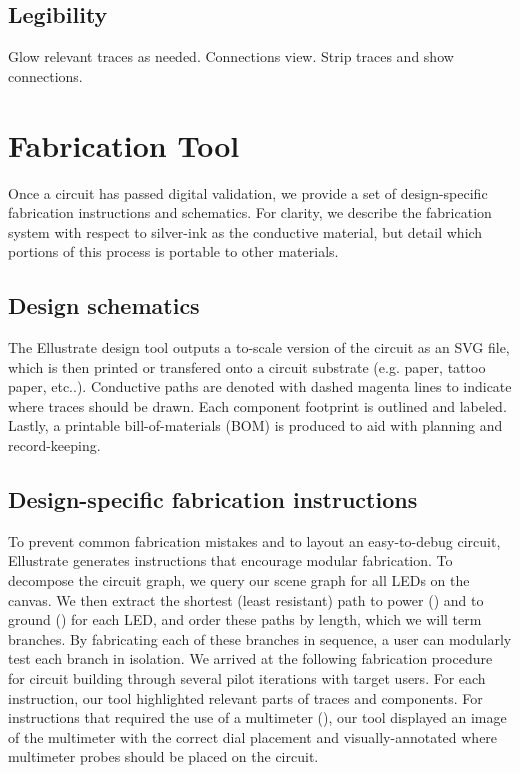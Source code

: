\documentclass{sigchi}
\begin{document}
    
    \subsection{Legibility}
        Glow relevant traces as needed.
        Connections view.
        Strip traces and show connections.

\section{Fabrication Tool}
    Once a circuit has passed digital validation, we provide a set of design-specific fabrication instructions and schematics. For clarity, we describe the fabrication system with respect to silver-ink as the conductive material, but detail which portions of this process is portable to other materials. 

    \subsection{Design schematics}
        The Ellustrate design tool outputs a to-scale version of the circuit as an SVG file, which is then printed or transfered onto a circuit substrate (e.g. paper, tattoo paper, etc..). Conductive paths are denoted with dashed magenta lines to indicate where traces should be drawn.
        Each component footprint is outlined and labeled. Lastly, a printable bill-of-materials (BOM) is produced to aid with planning and record-keeping.

    \subsection{Design-specific fabrication instructions}
        To prevent common fabrication mistakes and to layout an easy-to-debug circuit, Ellustrate generates instructions that encourage modular fabrication. To decompose the circuit graph, we query our scene graph for all LEDs on the canvas. We then extract the shortest (least resistant) path to power () and to ground () for each LED, and order these paths by length, which we will term branches. By fabricating each of these branches in sequence, a user can modularly test each branch in isolation. We arrived at the following fabrication procedure for circuit building through several pilot iterations with target users. For each instruction, our tool highlighted relevant parts of traces and components. For instructions that required the use of a multimeter (), our tool displayed an image of the multimeter with the correct dial placement and visually-annotated where multimeter probes should be placed on the circuit. 
\end{document}
